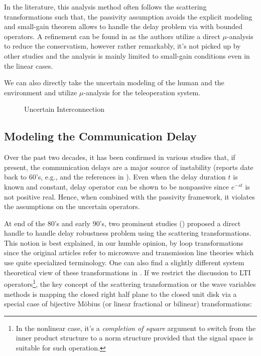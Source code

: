 In the literature, this analysis method often follows the scattering transformations such that, the passivity assumption avoids the
explicit modeling and small-gain theorem allows to handle the delay problem via with bounded operators. A refinement can be found 
 in \cite{poortenyokokohji} as the authors utilize a direct $\mu$-analysis to reduce the conservatism, however rather remarkably, it's not
picked up by other studies and the analysis is mainly limited to small-gain conditions even in the linear cases. 


We can also directly take the uncertain modeling of the human and the environment and utilize $\mu$-analysis for the teleoperation
system. 



\begin{figure}%
\centering%
\caption{Uncertain Interconnection}%
\label{fig:lit:uncincgeneral}%
\end{figure}



\subsection{Modeling the Communication Delay}

Over the past two decades, it has been confirmed in various studies that, if present, the communication delays are a major 
source of instability (reports date back to 60's, e.g., \cite{sheridanferrell} and the references in \cite{andersonspong}).
Even when the delay duration $t$ is known and constant, delay operator can be shown to be nonpassive since
$e^{-st}$ is not positive real. Hence, when combined with the passivity framework, it violates the assumptions on the uncertain
operators. 


At end of the 80's and early 90's, two prominent studies (\cite{andersonspong,nieslotine}) proposed a direct handle to handle delay 
robustness problem using the scattering transformations. This notion is best explained, in our humble opinion, by loop transformations 
since the original articles refer to microwave and transmission line theories which use quite specialized terminology. One can also
find a slightly different system theoretical view of these transformations in \cite{colgate3}. If we restrict the discussion to LTI
operators\footnote{In the nonlinear case, it's a \emph{completion of square} argument to switch from the inner product structure to a 
norm structure provided that the signal space is suitable for such operation.}, the key concept of the scattering transformation
or the wave variables methods is mapping the closed right half plane to the closed unit disk via a special case of bijective M\"{o}bius 
(or linear fractional or bilinear) transformations: 
 
